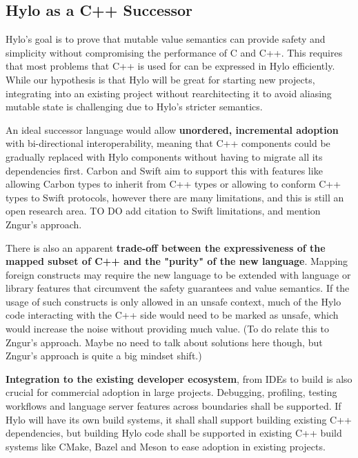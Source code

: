 \subsection{Hylo as a C++ Successor}
Hylo's goal is to prove that mutable value semantics can provide safety and simplicity without compromising the performance of C and C++\cite{hylo-lang}. This requires that most problems that C++ is used for can be expressed in Hylo efficiently. While our hypothesis is that Hylo will be great for starting new projects, integrating into an existing project without rearchitecting it to avoid aliasing mutable state is challenging  due to Hylo's stricter semantics.

An ideal successor language would allow \textbf{unordered, incremental adoption} with bi-directional interoperability\cite{requirements-for-cpp-successor-languages}, meaning that C++ components could be gradually replaced with Hylo components without having to migrate all its dependencies first. Carbon and Swift aim to support this with features like allowing Carbon types to inherit from C++ types\cite{carbon-interop-goals} or allowing to conform C++ types to Swift protocols\cite{swift-cpp-post-hoc-conformance}, however there are many limitations, and this is still an open research area. TO DO add citation to Swift limitations, and mention Zngur's approach.

There is also an apparent \textbf{trade-off between the expressiveness of the mapped subset of C++ and the "purity" of the new language}. Mapping foreign constructs may require the new language to be extended with language or library features that circumvent the safety guarantees and value semantics. If the usage of such constructs is only allowed in an unsafe context, much of the Hylo code interacting with the C++ side would need to be marked as unsafe, which would increase the noise without providing much value. (To do relate this to Zngur's approach. Maybe no need to talk about solutions here though, but Zngur's approach is quite a big mindset shift.)

\textbf{Integration to the existing developer ecosystem}, from IDEs to build is also crucial for commercial adoption in large projects. Debugging, profiling, testing workflows and language server features across boundaries shall be supported.\cite{requirements-for-cpp-successor-languages} If Hylo will have its own build systems, it shall shall support building existing C++ dependencies, but building Hylo code shall be supported in existing C++ build systems like CMake, Bazel and Meson to ease adoption in existing projects.

